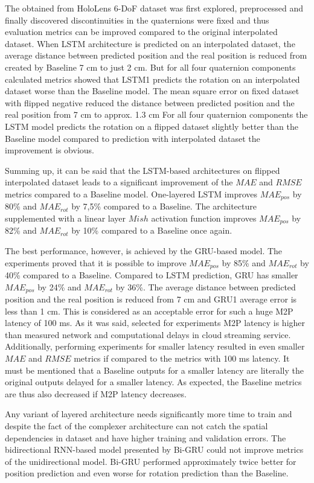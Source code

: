 The obtained from HoloLens 6-DoF dataset was first explored, preprocessed and finally discovered discontinuities in the quaternions were fixed and thus evaluation metrics can be improved compared to the original interpolated dataset. When LSTM architecture is predicted on an interpolated dataset, the average distance between predicted position and the real position is reduced from created by Baseline 7 cm to just 2 cm. But for all four quaternion components calculated metrics showed that LSTM1 predicts the rotation on an interpolated dataset worse than the Baseline model. The mean square error on fixed dataset with flipped negative reduced the distance between predicted position and the real position from 7 cm to approx. 1.3 cm For all four quaternion components the LSTM model predicts the rotation on a flipped dataset slightly better than the Baseline model compared to prediction with interpolated dataset the improvement is obvious. 

Summing up, it can be said that the LSTM-based architectures on flipped interpolated dataset leads to a significant improvement of the $MAE$ and $RMSE$ metrics compared to a Baseline model. One-layered LSTM improves $MAE_{pos}$ by 80\% and $MAE_{rot}$ by 7,5\% compared to a Baseline. The architecture supplemented with a linear layer $Mish$ activation function improves $MAE_{pos}$ by 82\% and $MAE_{rot}$ by 10\% compared to a Baseline once again.

The best performance, however, is achieved by the GRU-based model. The experiments proved that it is possible to improve $MAE_{pos}$ by 85\% and $MAE_{rot}$ by 40\% compared to a Baseline. Compared to LSTM prediction, GRU has smaller $MAE_{pos}$ by 24\% and $MAE_{rot}$ by 36\%. The average distance between predicted position and the real position is reduced from 7 cm and GRU1 average error is less than 1 cm. This is considered as an acceptable error for such a huge M2P latency of 100 ms. As it was said, selected for experiments M2P latency is higher than measured network and computational delays in cloud streaming service. Additionally, performing experiments for smaller latency resulted in even smaller $MAE$ and $RMSE$ metrics if compared to the metrics with 100 ms latency. It must be mentioned that a Baseline outputs for a smaller latency are literally the original outputs delayed for a smaller latency. As expected, the Baseline metrics are thus also decreased if M2P latency decreases. 

Any variant of layered architecture needs significantly more time to train and despite the fact of the complexer architecture can not catch the spatial dependencies in dataset and have higher training and validation errors. The bidirectional RNN-based model presented by Bi-GRU could not improve metrics of the unidirectional model. Bi-GRU performed approximately twice better for position prediction and even worse for rotation prediction than the Baseline.

